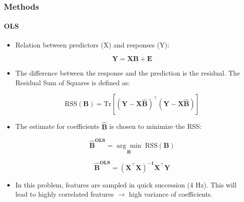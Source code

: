 \documentclass{beamer}
\begin{document}
\begin{frame}
	\frametitle{Methods}
	\framesubtitle{OLS}
	
	\begin{itemize}
		\pause
	\item Relation between predictors (X) and responses (Y):

	\begin{equation}
		\label{eqn:ols}
		\mathbf{Y = XB +  E}
	\end{equation}
\pause
\item The difference between the response and the prediction is the residual. The Residual Sum of Squares is defined as:
	
	\begin{equation} 
		\label{eqn:rss}
		\text{RSS}(\mathbf{B}) = \text{Tr}[\mathbf{(Y-X\hat{B})^\intercal (Y-X\hat{B})}]
	\end{equation}
\pause
\item The estimate for coefficients $\hat{\mathbf{B}}$ is chosen to minimize the RSS:

	\begin{equation}
		\label{eqn:betahat}
		\mathbf{\hat{B}^\text{OLS}} = \underset{\mathbf{B}}{\arg\min} 	\; 	\text{RSS}(\mathbf{B})
	\end{equation}

\begin{equation}
	\label{eqn:ols_beta}
	\mathbf{\hat{B}^\text{OLS}} = \mathbf{(X^\intercal X)^{-1} X^\intercal Y}
\end{equation}
\pause
\item \small In this problem, features are sampled in quick succession (4 Hz). This will lead to highly correlated features $\rightarrow$ high variance of coefficients.
\end{itemize}
	
\end{frame}
\end{document}
